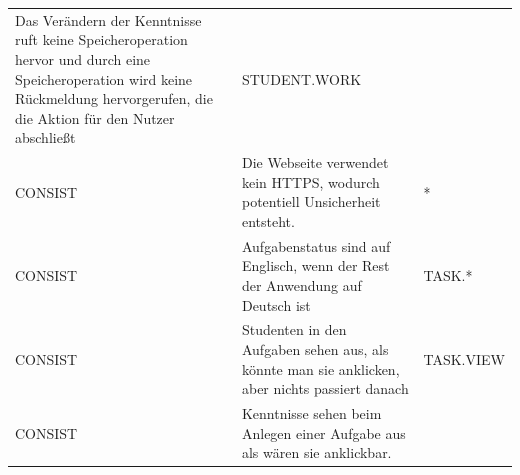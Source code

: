 \documentclass[
  12pt,
  ngerman,
  a4paper,
]{article}
\begin{document}
\begin{longtable}[]{@{}lll@{}}
\begin{minipage}[t]{0.49\columnwidth}
Das Verändern der Kenntnisse ruft keine Speicheroperation hervor und
durch eine Speicheroperation wird keine Rückmeldung hervorgerufen, die
die Aktion für den Nutzer abschließt\strut
\end{minipage} & \begin{minipage}[t]{0.27\columnwidth}\raggedright
STUDENT.WORK\strut
\end{minipage}\tabularnewline
\begin{minipage}[t]{0.15\columnwidth}\raggedright
CONSIST\strut
\end{minipage} & \begin{minipage}[t]{0.49\columnwidth}\raggedright
Die Webseite verwendet kein HTTPS, wodurch potentiell Unsicherheit
entsteht.\strut
\end{minipage} & \begin{minipage}[t]{0.27\columnwidth}\raggedright
*\strut
\end{minipage}\tabularnewline
\begin{minipage}[t]{0.15\columnwidth}\raggedright
CONSIST\strut
\end{minipage} & \begin{minipage}[t]{0.49\columnwidth}\raggedright
Aufgabenstatus sind auf Englisch, wenn der Rest der Anwendung auf
Deutsch ist\strut
\end{minipage} & \begin{minipage}[t]{0.27\columnwidth}\raggedright
TASK.*\strut
\end{minipage}\tabularnewline
\begin{minipage}[t]{0.15\columnwidth}\raggedright
CONSIST\strut
\end{minipage} & \begin{minipage}[t]{0.49\columnwidth}\raggedright
Studenten in den Aufgaben sehen aus, als könnte man sie anklicken, aber
nichts passiert danach\strut
\end{minipage} & \begin{minipage}[t]{0.27\columnwidth}\raggedright
TASK.VIEW\strut
\end{minipage}\tabularnewline
\begin{minipage}[t]{0.15\columnwidth}\raggedright
CONSIST\strut
\end{minipage} & \begin{minipage}[t]{0.49\columnwidth}\raggedright
Kenntnisse sehen beim Anlegen einer Aufgabe aus als wären sie
anklickbar.\strut
\end{minipage} & \begin{minipage}[t]{0.27\columnwidth}\raggedright

\end{minipage}
\end{longtable}
\end{document}
